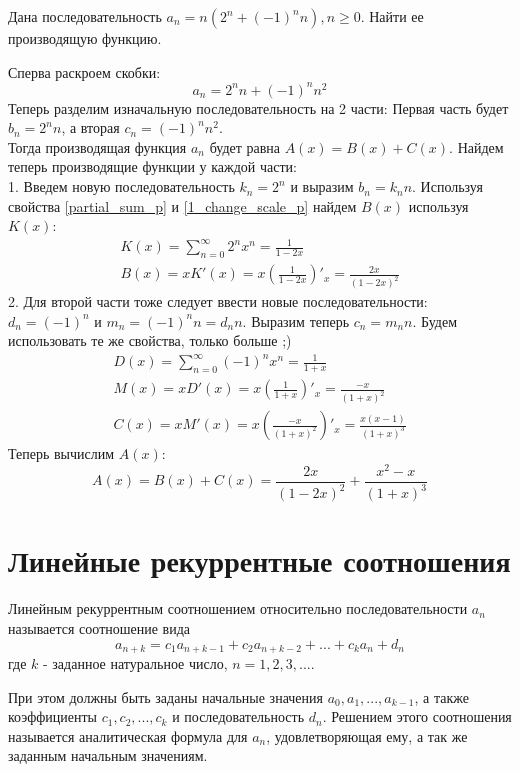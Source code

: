 \begin{task}
    Дана последовательность $a_n = n(2^n + (-1)^n n), n \geq 0$. Найти ее
    производящую функцию.
    \begin{solution}
        Сперва раскроем скобки: 
        \begin{equation*}
            a_n = 2^n n + (-1)^n n^2
        \end{equation*}
        Теперь разделим изначальную последовательность на 2 части:
        Первая часть будет $b_n = 2^n n$, а вторая $c_n = (-1)^n n^2$. \\
        Тогда производящая функция $a_n$ будет равна $A(x) = B(x) + C(x)$.
        Найдем теперь производящие функции у каждой части: \\
        1. Введем новую последовательность $k_n = 2^n$ и выразим $b_n = k_n n$.
        Используя свойства \ref{partial_sum_p} и \ref{1_change_scale_p} найдем $B(x)$ используя $K(x)$:
        \begin{gather*}
            K(x) = \sum_{n = 0}^{\infty} 2^n x^n = \frac{1}{1 - 2x} \\
            B(x) = xK'(x) = x (\frac{1}{1 - 2x})'_x = \frac{2x}{(1 - 2x)^2}
        \end{gather*}
        2. Для второй части тоже следует ввести новые последовательности:
        $d_n = (-1)^n$ и $m_n = (-1)^n n = d_n n$. Выразим теперь
        $c_n = m_n n$. Будем использовать те же свойства, только больше ;)
        \begin{gather*}
            D(x) = \sum_{n = 0}^{\infty}(-1)^n x^n = \frac{1}{1 + x} \\
            M(x) = x D'(x) = x (\frac{1}{1 + x})'_x = \frac{-x}{(1 + x)^2} \\
            C(x) = x M'(x) = x (\frac{-x}{(1 + x)^2})'_x = \frac{x(x - 1)}{(1 + x)^3}
        \end{gather*}
        Теперь вычислим $A(x)$:
        \begin{equation*}
            A(x) = B(x) + C(x) = \frac{2x}{(1 - 2x)^2} + \frac{x^2 - x}{(1 + x)^3}
        \end{equation*}
    \end{solution}
\end{task}

\section{Линейные рекуррентные соотношения}
\begin{utv}
    Линейным рекуррентным соотношением относительно последовательности $a_n$ называется
    соотношение вида 
    \begin{equation}
        a_{n+k} = c_1 a_{n+k-1} + c_2 a_{n+k-2} + ... + c_k a_n + d_n
    \end{equation}
    где $k$ - заданное натуральное число, $n = 1, 2, 3, ...$. 
\end{utv}
При этом должны быть заданы начальные значения $a_0, a_1, ..., a_{k-1}$, 
а также коэффициенты $c_1, c_2, ..., c_k$ и последовательность $d_n$. Решением 
этого соотношения называется аналитическая формула для $a_n$, удовлетворяющая ему, 
а так же заданным начальным значениям.

